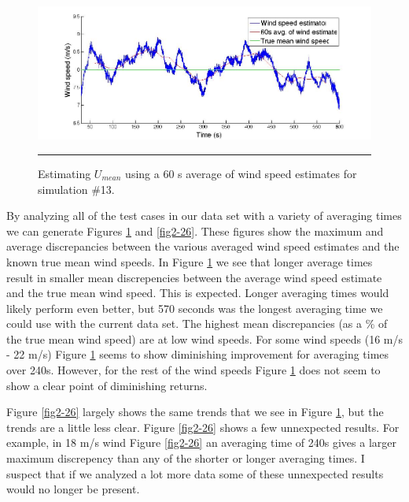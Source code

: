 \begin{figure}[htbp]
	\centering
		\includegraphics[trim = {3cm 0 2.5cm 0}, clip, width = \linewidth]{Figures/ch2Figures/fig2-25.jpg}
		\rule{35em}{0.5pt}
	\caption{Estimating $U_{mean}$ using a 60 s average of wind speed estimates for simulation \#13.}
	\label{fig2-25}
\end{figure}

By analyzing all of the test cases in our data set with a variety of averaging times we can generate Figures \ref{fig2-25} and \ref{fig2-26}. These figures show the maximum and average discrepancies between the various averaged wind speed estimates and the known true mean wind speeds. In Figure \ref{fig2-25} we see that longer average times result in smaller mean discrepencies between the average wind speed estimate and the true mean wind speed. This is expected. Longer averaging times would likely perform even better, but 570 seconds was the longest averaging time we could use with the current data set. The highest mean discrepancies (as a \% of the true mean wind speed) are at low wind speeds. For some wind speeds (16 m/s - 22 m/s) Figure \ref{fig2-25} seems to show diminishing improvement for averaging times over 240s. However, for the rest of the wind speeds Figure \ref{fig2-25} does not seem to show a clear point of diminishing returns.

Figure \ref{fig2-26} largely shows the same trends that we see in Figure \ref{fig2-25}, but the trends are a little less clear. Figure \ref{fig2-26} shows a few unnexpected results. For example, in 18 m/s wind Figure \ref{fig2-26} an averaging time of 240s gives a larger maximum discrepency than any of the shorter or longer averaging times. I suspect that if we analyzed a lot more data some of these unnexpected results would no longer be present.



